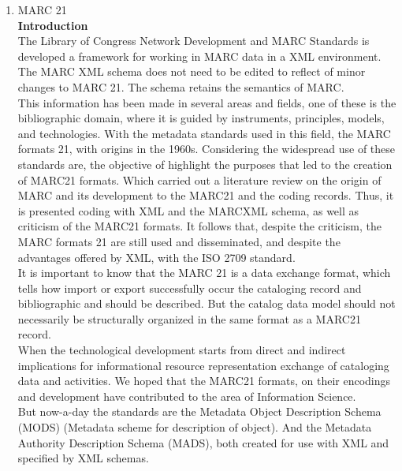 \begin{enumerate}
	\item MARC 21\\
	{\bf Introduction}\\
	The Library of Congress Network Development and MARC Standards is developed a framework for working in MARC data in a XML environment. 
	The MARC XML schema does not need to be edited to reflect of minor changes to MARC 21. 
	The schema retains the semantics of MARC.\\
	This information has been made in several areas and fields, one of these is the bibliographic domain, where it is guided by instruments, principles, models, and technologies. 
	With the metadata standards used in this field, the MARC formats 21, with origins in the 1960s. 
	Considering the widespread use of these standards are, the objective of highlight the purposes that led to the creation of MARC21 formats. 
	Which carried out a literature review on the origin of MARC and its development to the MARC21 and the coding records. 
	Thus, it is presented coding with XML and the MARCXML schema, as well as criticism of the MARC21 formats. 
	It follows that, despite the criticism, the MARC formats 21 are still used and disseminated, and despite the advantages offered by XML, with the ISO 2709 standard. \\
	It is important to know that the MARC 21 is a data exchange format, which tells how import or export successfully occur the cataloging record and bibliographic and should be described. 
	But the catalog data model should not necessarily be structurally organized in the same format as a MARC21 record. \\
	When the technological development starts from direct and indirect implications for informational resource representation exchange of cataloging data and activities. 
	We hoped that the MARC21 formats, on their encodings and development have contributed to the area of Information Science. \\
	But now-a-day the standards are the Metadata Object Description Schema (MODS) (Metadata scheme for description of object).
	And the Metadata Authority Description Schema (MADS), both created for use with XML and specified by XML schemas.
	

\end{enumerate}
